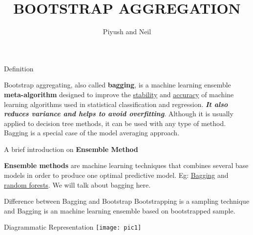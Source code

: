 \documentclass[13pt]{beamer}
\author{Piyush and Neil}
\title{BOOTSTRAP AGGREGATION}
\institute{IIT Hyderabad}
\begin{document}
\begin{frame}
\titlepage
\end{frame}

\begin{frame}{Definition}
\begin{block}

Bootstrap aggregating, also called \textbf{bagging}, is a machine learning ensemble \textbf{meta-algorithm} designed to improve the \underline{stability} and \underline{accuracy} of machine learning algorithms used in statistical classification and regression. \textbf{\textit{It also reduces variance and helps to avoid overfitting}}. Although it is usually applied to decision tree methods, it can be used with any type of method. Bagging is a special case of the model averaging approach.

\end{block}
\end{frame}

\begin{frame}{A brief introduction on \textbf{Ensemble Method}}

\begin{block}

\textbf{Ensemble methods} are machine learning techniques that combines several base models in order to produce one optimal predictive model. Eg: \underline{Bagging} and \underline{random forests}.
We will talk about bagging here.
\end{block} \vspace{16pt}

\begin{block}{Difference between Bagging and Bootstrap}
Bootstrapping is a sampling technique and Bagging is an machine learning ensemble based on bootstrapped sample.

\end{block}


\end{frame}

\begin{frame}{Diagrammatic Representation}
\texttt{[image: pic1]}

\end{frame}
\end{document}
